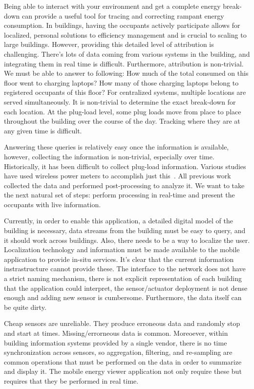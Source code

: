 Being able to interact with your environment and get a complete energy break-down can provide a useful tool
for tracing and correcting rampant energy consumption.  In buildings, having the occupants actively participate
allows for localized, personal solutions to efficiency management and is crucial to scaling to large buildings.
However, providing this detailed level of attribution is challenging.  There's lots of data coming from various systems 
in the building, and integrating them in real time is difficult.  Furthermore, attribution is non-trivial.  
We must be able to answer to following: How much of the total consumed on this floor went to charging laptops?  How
many of those charging laptops belong to registered occupants of this floor?
For centralized systems, multiple locations are served simultaneously.  It is non-trivial to determine the exact
break-down for each location.  At the plug-load level, some plug loads move from place to place throughout the building
over the course of the day.  Tracking where they are at any given time is difficult.

Answering these queries is relatively easy once the information is available, however, collecting the information
is non-trivial, especially over time.  Historically, it has been difficult to collect plug-load information.
Various studies have used wireless power meters to accomplish just this~\cite{stephscale, lanz, aceee}.
All previous work collected the data and performed post-processing to analyze it.  We want to take the next
natural set of steps: perform processing in real-time and present the occupants with live information.

Currently, in order to enable this application, a detailed digital model of the building is necessary, data streams from the building must
be easy to query, and it should work across buildings.  Also, there needs to be a way to localize the user. 
Localization technology and information must be made available to the mobile application to provide in-situ services.
It's clear that the current information instrastructure cannot provide these.  The interface to the network does not have
a strict naming mechanism, there is not explicit representation of each building that the application could interpret, 
the sensor/actuator deployment is not dense enough and adding new sensor is cumbersome.  Furthermore, the data itself can be quite dirty.

Cheap sensors are unreliable.  They produce erroneous data and randomly stop and start at times.  Missing/errorneous data is common.
Moreoever, within building information systems provided by a single vendor, there is no time synchronization across sensors, so
aggregation, filtering, and re-sampling are common operations that must be performed on the data in order to summarize and display it.
The mobile energy viewer application not only require these but requires that they be performed in real time.





